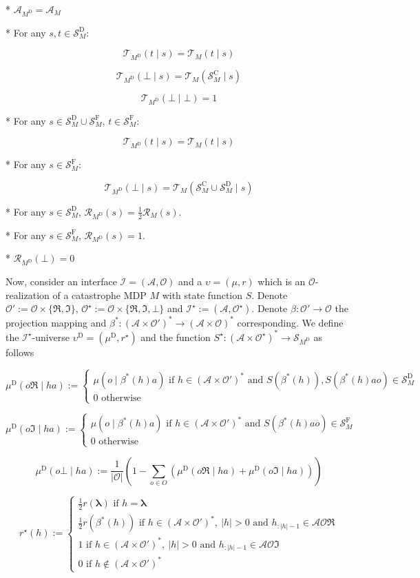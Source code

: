 \documentclass[a4paper]{article}
\newcommand{\AP}[1]{\left(#1\right)}
\newcommand{\Estr}{\boldsymbol{\lambda}}
\newcommand{\Abs}[1]{\left\vert #1 \right\vert}
\newcommand{\Ob}{\mathcal{O}}
\newcommand{\A}{\mathcal{A}}
\newcommand{\St}{\mathcal{S}}
\newcommand{\T}{\mathcal{T}}
\newcommand{\R}{\mathcal{R}}
\newcommand{\In}{\mathcal{I}}
\newcommand{\RMC}{\mathrm{C}}
\newcommand{\RMD}{\mathrm{D}}
\newcommand{\RMF}{\mathrm{F}}
\newcommand{\SF}{\St^{\RMF}}
\newcommand{\SD}{\St^{\RMD}}
\newcommand{\SC}{\St^{\RMC}}
\newcommand{\MD}{M^{\RMD}}
\newcommand{\UD}{\upsilon^{\RMD}}
\begin{document}
* $\A_{\MD} = \A_M$

* For any $s,t \in \SD_M$:

$$\T_{\MD}(t \mid s) = \T_M(t \mid s)$$

$$\T_{\MD}(\bot \mid s) = \T_M(\SC_M \mid s)$$

$$\T_{\MD}(\bot \mid \bot) = 1$$

* For any $s \in \SD_M \cup \SF_M$, $t \in \SF_M$:

$$\T_{\MD}(t \mid s) = \T_M(t \mid s)$$

* For any $s \in \SF_M$:

$$\T_{\MD}(\bot \mid s) = \T_M(\SC_M \cup \SD_M \mid s)$$

* For any $s \in \SD_M$, $\R_{\MD}(s) = \frac{1}{2}\R_M(s)$.

* For any $s \in \SF_M$, $\R_{\MD}(s) = 1$.

* $\R_{\MD}(\bot) = 0$

Now, consider an interface $\In=(\A,\Ob)$ and a $\upsilon=(\mu,r)$ which is an $\Ob$-realization of a catastrophe MDP $M$ with state function $S$. Denote $\Ob':=\Ob\times\{\Re,\Im\}$, $\Ob^\star:=\Ob \times \{\Re,\Im,\bot\}$ and $\In^\star:=(\A,\Ob^\star)$. Denote $\beta: \Ob' \rightarrow \Ob$ the projection mapping and $\beta^*: \AP{\A \times \Ob'}^* \rightarrow \AP{\A \times \Ob}^*$ corresponding. We define the $\In^\star$-universe $\UD=(\mu^\RMD,r^\star)$ and the function $S^\star: \AP{\A \times \Ob^\star}^* \rightarrow \St_{\MD}$ as follows

$$\mu^\RMD(o\Re \mid ha) := \begin{cases} \mu\AP{o \mid \beta^*(h)a} \text{ if } h\in\AP{\A \times \Ob'}^* \text{ and } S\AP{\beta^*(h)},S\AP{\beta^*(h)ao}\in\SD_M \\ 0 \text{ otherwise} \end{cases}$$

$$\mu^\RMD(o\Im \mid ha) := \begin{cases} \mu\AP{o \mid \beta^*(h)a} \text{ if } h\in\AP{\A \times \Ob'}^* \text{ and } S\AP{\beta^*(h)ao}\in\SF_M \\ 0 \text{ otherwise} \end{cases}$$

$$\mu^\RMD(o\bot \mid ha) := \frac{1}{\Abs{\Ob}}\AP{1 - \sum_{o \in O} \AP{\mu^\RMD(o\Re \mid ha) + \mu^\RMD(o\Im \mid ha)}}$$

$$r^\star(h):=\begin{cases} \frac{1}{2}r(\Estr) \text{ if } h = \Estr \\ \frac{1}{2}r\AP{\beta^*(h)} \text{ if } h\in\AP{\A \times \Ob'}^*,\ \Abs{h}>0 \text{ and } h_{:\Abs{h}-1}\in\A\Ob\Re \\ 1 \text{ if } h\in\AP{\A \times \Ob'}^*,\ \Abs{h}>0 \text{ and } h_{:\Abs{h}-1}\in\A\Ob\Im \\ 0 \text{ if } h\not\in\AP{\A \times \Ob'}^* \end{cases}$$
\end{document}
